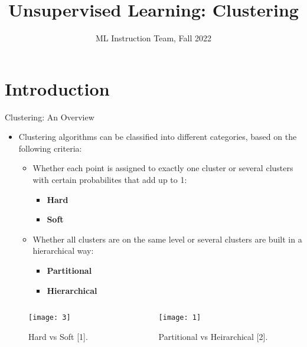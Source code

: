 \documentclass[compress,oilve]{beamer}
\title{Unsupervised Learning: Clustering}
\author{ML Instruction Team, Fall 2022}
\institute[]{CE Department \newline  Sharif University of Technology \newline \newline}
\date[\today]{}
\begin{document}
	
	\fontsize{9}{9}
\begin{frame}
	\titlepage
\end{frame}

\section{Introduction}

\begin{frame}{Clustering: An Overview}
\begin{itemize}
\item Clustering algorithms can be classified into different categories, based on the following criteria:
	\begin{itemize}
		\item Whether each point is assigned to exactly one cluster or several clusters with certain probabilites that add up to 1:
			\begin{itemize}
				\item \textbf{Hard}
				\item \textbf{Soft}
			\end{itemize}
		\item Whether all clusters are on the same level or several clusters are built in a hierarchical way:
			\begin{itemize}
				\item \textbf{Partitional}
				\item \textbf{Hierarchical}
			\end{itemize}
	\end{itemize}
\end{itemize}
\begin{columns}
	\begin{column}{0.5\textwidth}
		\begin{figure}
			 \centering
			 \texttt{[image: 3]} 
			 \caption{Hard vs Soft [1].}
		\end{figure}
	\end{column}
	\begin{column}{0.5\textwidth}
		\begin{figure}
			 \centering
			 \texttt{[image: 1]}  
 			 \caption{Partitional vs Heirarchical [2].}
		\end{figure}
	\end{column}
\end{columns}
\end{frame}
\end{document}
